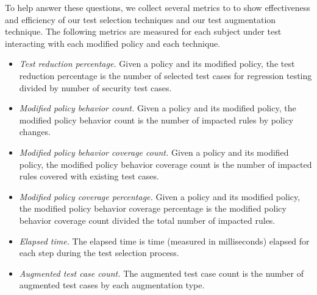 To help answer these questions, we collect several metrics to
to show effectiveness and efficiency of our test selection techniques and
our test augmentation technique. 
The following metrics are
measured for each subject under test interacting with each modified policy
and each technique.
\begin{itemize}
	\item \textit{Test reduction percentage.}  Given a policy and its modified
	policy, the test reduction percentage is the number of selected test cases for regression testing divided by number of security test cases.
		\item \textit{Modified policy behavior count.}  Given a policy and its modified
	policy, the modified policy behavior count is the number of impacted rules by policy changes.
	\item \textit{Modified policy behavior coverage count.}  Given a policy and its modified
	policy, the modified policy behavior coverage count is the number of
	impacted rules covered with existing test cases.
	\item \textit{Modified policy coverage percentage.}  Given a policy and its modified
	policy, the modified policy behavior coverage percentage is the modified policy behavior coverage count divided the total number of impacted rules.
	\item \textit{Elapsed time.}  The elapsed time is time (measured in milliseconds) elapsed for each step during the test selection process.
	\item \textit{Augmented test case count.}  The augmented test case count is the number of augmented test cases by each augmentation type.
	
\end{itemize}
 
%


